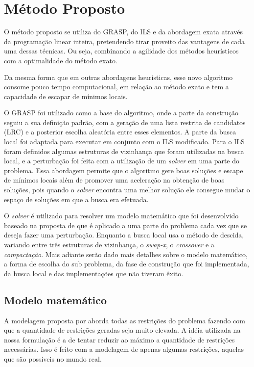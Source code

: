 \chapter{Método Proposto} \label{cap:metodoprop}
  
O método proposto se utiliza do GRASP, do ILS e da abordagem exata através da
programação linear inteira, pretendendo tirar proveito das vantagens de cada
uma dessas técnicas. Ou seja, combinando a agilidade dos métodos heurísticos com
a optimalidade do método exato.
  
Da mesma forma que em outras abordagens heurísticas, esse novo algoritmo
consome pouco tempo computacional, em relação ao método exato e tem a capacidade
de escapar de mínimos locais.
  
O GRASP foi utilizado como a base do algoritmo, onde a parte da construção
seguiu a sua definição padrão, com a geração de uma lista restrita de candidatos
(LRC) e a posterior escolha aleatória entre esses elementos. A parte da busca
local foi adaptada para executar em conjunto com o ILS modificado. Para o ILS
foram definidos algumas estruturas de vizinhança que foram utilizadas
na busca local, e a perturbação foi feita com a utilização de um \textit{solver}
em uma parte do problema. Essa abordagem permite que o algoritmo gere boas
soluções e escape de mínimos locais além de promover uma aceleração na obtenção
de boas soluções, pois quando o \textit{solver} encontra uma melhor solução ele
consegue mudar o espaço de soluções em que a busca era efetuada.


O \textit{solver} é utilizado para resolver um modelo matemático que foi
desenvolvido baseado na proposta de \cite{pontes2002} que é aplicado a uma parte do problema cada
vez que se deseja fazer uma perturbação. Enquanto a busca local usa o método de
descida, variando entre três estruturas de vizinhança, o \textit{swap-x}, o
\textit{crossover} e a \textit{compactação}. Mais adiante serão dado mais
detalhes sobre o modelo matemático, a forma de escolha do sub problema, da fase
de construção que foi implementada, da busca local e das implementações que não
tiveram êxito.

\section{Modelo matemático} \label{sec:modelomat}

   
A modelagem proposta por \cite{pontes2002} aborda todas as restrições do
problema fazendo com que a quantidade de restrições geradas seja muito elevada.
A idéia utilizada na nossa formulação é a de tentar reduzir ao máximo a
quantidade de restrições necessárias. Isso é feito com a modelagem de apenas
algumas restrições, aquelas que são possíveis no mundo real.

